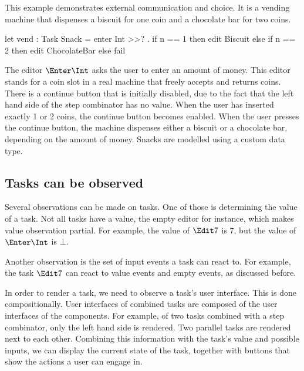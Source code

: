 \begin{example}
\label{Vending machine}

This example demonstrates external communication and choice.
It is a vending machine that dispenses a biscuit for one coin and a chocolate bar for two coins.
\begin{TASK}
  let vend : Task Snack = enter Int >>? \n. if n == 1 then edit Biscuit
    else if n == 2 then edit ChocolateBar
    else fail
\end{TASK}
The editor $\Enter \Int$ asks the user to enter an amount of money.
This editor stands for a coin slot in a real machine that freely accepts and returns coins.
There is a continue button that is initially disabled, due to the fact that the left hand side of the step combinator has no value.
When the user has inserted exactly 1 or 2 coins, the continue button becomes enabled.
When the user presses the continue button, the machine dispenses either a biscuit or a chocolate bar, depending on the amount of money.
Snacks are modelled using a custom data type.

\end{example}



\subsection{Tasks can be observed}

Several observations can be made on tasks.
One of those is determining the value of a task.
Not all tasks have a value, the empty editor for instance, which makes value observation partial.
For example, the value of $\Edit 7$ is $7$, but the value of $\Enter \Int$ is $\bot$.

Another observation is the set of input events a task can react to.
For example, the task $\Edit 7$ can react to value events and empty events, as discussed before.

In order to render a task, we need to observe a task's user interface.
This is done compositionally.
User interfaces of combined tasks are composed of the user interfaces of the components.
For example, of two tasks combined with a step combinator, only the left hand side is rendered.
Two parallel tasks are rendered next to each other.
Combining this information with the task's value and possible inputs,
we can display the current state of the task,
together with buttons that show the actions a user can engage in.

